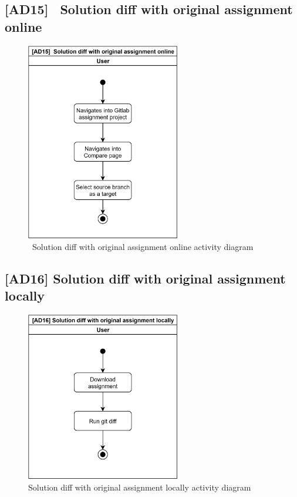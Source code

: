\subsection{{[}AD15{]} ~Solution diff with original assignment online} \label{ssec:ad15}

\begin{figure}[H]
    \centering
    \includegraphics[width=0.6\textwidth,height=\textheight,keepaspectratio]{Figures/ad/ad6.png}
    \caption{~Solution diff with original assignment online activity diagram}
\end{figure}

\subsection{{[}AD16{]} Solution diff with original assignment locally} \label{ssec:ad16}

\begin{figure}[H]
    \centering
    \includegraphics[width=0.6\textwidth,height=\textheight,keepaspectratio]{Figures/ad/ad10.png}
    \caption{Solution diff with original assignment locally activity diagram}
\end{figure}

